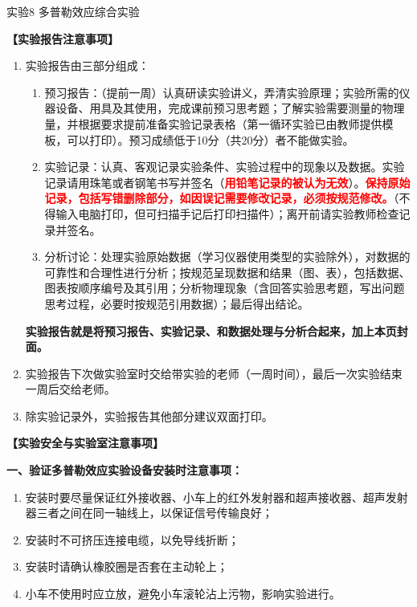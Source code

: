 \documentclass[dvipsnames, svgnames,a4paper,11pt]{article}
\begin{document}

\infoTable{}{}{}{}{}{} %

\begin{center}
	\LARGE 实验8 \quad 多普勒效应综合实验
\end{center}

\textbf{【实验报告注意事项】}
\begin{enumerate}
	\item 实验报告由三部分组成：
	\begin{enumerate}
		\item 预习报告：（提前一周）认真研读实验讲义，弄清实验原理；实验所需的仪器设备、用具及其使用，完成课前预习思考题；了解实验需要测量的物理量，并根据要求提前准备实验记录表格（第一循环实验已由教师提供模板，可以打印）。预习成绩低于10分（共20分）者不能做实验。
	    \item 实验记录：认真、客观记录实验条件、实验过程中的现象以及数据。实验记录请用珠笔或者钢笔书写并签名（\textcolor{red}{\textbf{用铅笔记录的被认为无效}}）。\textcolor{red}{\textbf{保持原始记录，包括写错删除部分，如因误记需要修改记录，必须按规范修改。}}（不得输入电脑打印，但可扫描手记后打印扫描件）；离开前请实验教师检查记录并签名。
	    \item 分析讨论：处理实验原始数据（学习仪器使用类型的实验除外），对数据的可靠性和合理性进行分析；按规范呈现数据和结果（图、表），包括数据、图表按顺序编号及其引用；分析物理现象（含回答实验思考题，写出问题思考过程，必要时按规范引用数据）；最后得出结论。
	\end{enumerate}
	\textbf{实验报告就是将预习报告、实验记录、和数据处理与分析合起来，加上本页封面。}
	\item 实验报告下次做实验室时交给带实验的老师（一周时间），最后一次实验结束一周后交给老师。
	\item 除实验记录外，实验报告其他部分建议双面打印。
\end{enumerate}

\textbf{【实验安全与实验室注意事项】}

\textbf{一、验证多普勒效应实验设备安装时注意事项：}
\begin{enumerate}
	\item 安装时要尽量保证红外接收器、小车上的红外发射器和超声接收器、超声发射器三者之间在同一轴线上，以保证信号传输良好；
	\item 安装时不可挤压连接电缆，以免导线折断；
	\item 安装时请确认橡胶圈是否套在主动轮上；
	\item 小车不使用时应立放，避免小车滚轮沾上污物，影响实验进行。
\end{enumerate}
\end{document}
